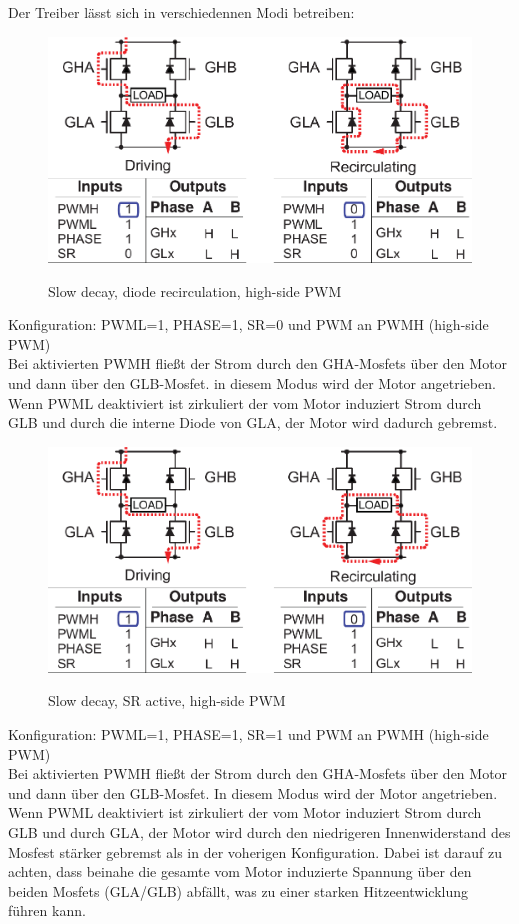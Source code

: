 Der Treiber lässt sich in verschiedennen Modi betreiben:

\begin{figure}[H]
\centering
\includegraphics[width=.8\textwidth]{3941_1.png}\\
\caption{Slow decay, diode recirculation, high-side PWM \cite{ds-A3941}}%
\label{fig:39411}
\end{figure}

Konfiguration: PWML=1, PHASE=1, SR=0 und PWM an PWMH (high-side PWM)\\
Bei aktivierten PWMH fließt der Strom durch den GHA-Mosfets über den Motor und
dann über den GLB-Mosfet. in diesem Modus wird der Motor angetrieben.
Wenn PWML deaktiviert ist zirkuliert der vom Motor induziert Strom durch GLB und durch
die interne Diode von GLA, der Motor wird dadurch gebremst.


\begin{figure}[H]
\centering
\includegraphics[width=.8\textwidth]{3941_2.png}\\
\caption{Slow decay, SR active, high-side PWM \cite{ds-A3941}}%
\label{fig:39412}
\end{figure}

Konfiguration: PWML=1, PHASE=1, SR=1 und PWM an PWMH (high-side PWM)\\
Bei aktivierten PWMH fließt der Strom durch den GHA-Mosfets über den Motor und
dann über den GLB-Mosfet. In diesem Modus wird der Motor angetrieben.
Wenn PWML deaktiviert ist zirkuliert der vom Motor induziert Strom durch 
GLB und durch GLA, der Motor wird durch den niedrigeren Innenwiderstand des Mosfest 
stärker gebremst als in der voherigen Konfiguration. Dabei ist darauf zu achten, dass
beinahe die gesamte vom Motor induzierte Spannung über den beiden Mosfets (GLA/GLB) abfällt,
was zu einer starken Hitzeentwicklung führen kann.



